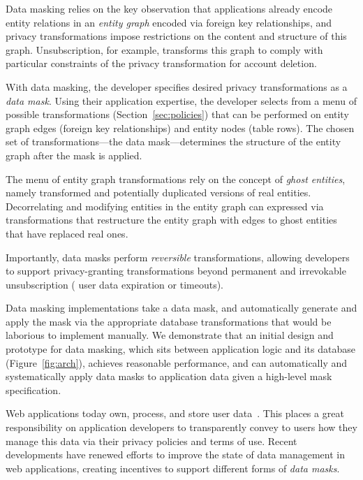 Data masking relies on the key observation that applications already encode entity relations in an
\emph{entity graph} encoded via \eg foreign key relationships, and privacy transformations impose
restrictions on the content and structure of this graph. Unsubscription, for example, transforms
this graph to comply with particular constraints of the privacy transformation for account deletion.

With data masking, the developer specifies desired privacy transformations as a \emph{data mask}.
Using their application expertise, the developer selects from a menu of possible transformations
(Section~\ref{sec:policies}) that can be performed on entity graph edges (foreign key relationships)
and entity nodes (table rows). The chosen set of transformations---the data mask---determines the
structure of the entity graph after the mask is applied.

The menu of entity graph transformations rely on the concept of \emph{ghost entities}, namely
transformed and potentially duplicated versions of real entities. Decorrelating and modifying
entities in the entity graph can expressed via transformations that restructure the entity graph
with edges to ghost entities that have replaced real ones.

Importantly, data masks perform \emph{reversible} transformations, allowing developers to support
privacy-granting transformations beyond permanent and irrevokable unsubscription (\eg
user data expiration or timeouts).

Data masking implementations take a data mask, and automatically generate and apply the mask via the
appropriate database transformations that would be laborious to implement manually.
We demonstrate that an initial design and prototype for data masking, which sits between application logic and
its database (Figure~\ref{fig:arch}), achieves reasonable performance, and can automatically and systematically apply data
masks to application data given a high-level mask specification.

\iffalse
Web applications today own, process, and store user data~\cite{nytimes:fb, npr:data}. This places a
great responsibility on application developers to transparently convey to users how they manage this
data via their privacy policies and terms of use.
%
Recent developments have renewed efforts to improve the state of data management in web
applications, creating incentives to support different forms of \emph{data masks}.

